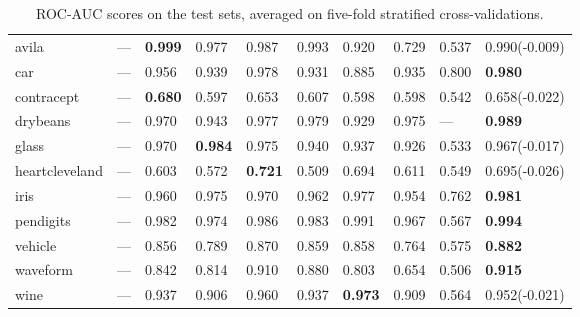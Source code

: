 \begin{table}[ht]
\begin{tabular}{l|llllllll|l}
  avila & --- & \textbf{0.999} & 0.977 & 0.987 & 0.993 & 0.920 & 0.729 & 0.537 & 0.990\tiny{(-0.009)} \\ 
  car & --- & 0.956 & 0.939 & 0.978 & 0.931 & 0.885 & 0.935 & 0.800 & \textbf{0.980} \\ 
  contracept & --- & \textbf{0.680} & 0.597 & 0.653 & 0.607 & 0.598 & 0.598 & 0.542 & 0.658\tiny{(-0.022)} \\ 
  drybeans & --- & 0.970 & 0.943 & 0.977 & 0.979 & 0.929 & 0.975 & --- & \textbf{0.989} \\ 
  glass & --- & 0.970 & \textbf{0.984} & 0.975 & 0.940 & 0.937 & 0.926 & 0.533 & 0.967\tiny{(-0.017)} \\ 
  heartcleveland & --- & 0.603 & 0.572 & \textbf{0.721} & 0.509 & 0.694 & 0.611 & 0.549 & 0.695\tiny{(-0.026)} \\ 
  iris & --- & 0.960 & 0.975 & 0.970 & 0.962 & 0.977 & 0.954 & 0.762 & \textbf{0.981} \\ 
  pendigits & --- & 0.982 & 0.974 & 0.986 & 0.983 & 0.991 & 0.967 & 0.567 & \textbf{0.994} \\ 
  vehicle & --- & 0.856 & 0.789 & 0.870 & 0.859 & 0.858 & 0.764 & 0.575 & \textbf{0.882} \\ 
  waveform & --- & 0.842 & 0.814 & 0.910 & 0.880 & 0.803 & 0.654 & 0.506 & \textbf{0.915} \\ 
  wine & --- & 0.937 & 0.906 & 0.960 & 0.937 & \textbf{0.973} & 0.909 & 0.564 & 0.952\tiny{(-0.021)} \\ 
   \hline
\end{tabular}
\caption{ROC-AUC scores on the test sets, averaged on five-fold stratified cross-validations.} \label{table:roc_auc}
\end{table}